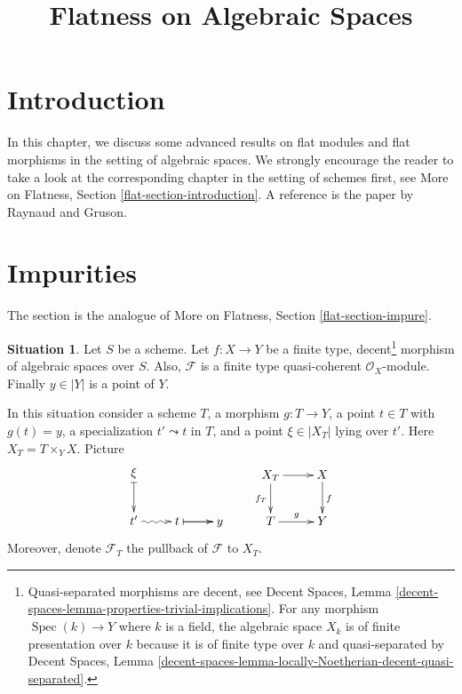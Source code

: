 \documentclass{stacks-project}
\theoremstyle{plain}
\theoremstyle{definition}
\newtheorem{situation}[subsection]{Situation}
\theoremstyle{remark}
\numberwithin{equation}{subsection}
\def\Spec{\mathop{\mathrm{Spec}}}
\begin{document}
\title{Flatness on Algebraic Spaces}

\maketitle

\label{section-phantom}

\tableofcontents



\section{Introduction}
\label{section-introduction}

\noindent
In this chapter, we discuss some advanced results on flat modules and
flat morphisms in the setting of algebraic spaces. We strongly encourage
the reader to take a look at the corresponding
chapter in the setting of schemes first, see
More on Flatness, Section \ref{flat-section-introduction}.
A reference is the paper \cite{GruRay} by Raynaud and Gruson.







\section{Impurities}
\label{section-impure}

\noindent
The section is the analogue of
More on Flatness, Section \ref{flat-section-impure}.

\begin{situation}
\label{situation-pre-pure}
Let $S$ be a scheme. Let $f : X \to Y$ be a
finite type, decent\footnote{Quasi-separated morphisms are decent, see
Decent Spaces, Lemma
\ref{decent-spaces-lemma-properties-trivial-implications}.
For any morphism $\Spec(k) \to Y$ where $k$ is a field,
the algebraic space $X_k$ is of finite presentation over $k$
because it is of finite type over $k$ and quasi-separated by
Decent Spaces, Lemma
\ref{decent-spaces-lemma-locally-Noetherian-decent-quasi-separated}.}
morphism of algebraic spaces over $S$. Also, $\mathcal{F}$ is a finite type
quasi-coherent $\mathcal{O}_X$-module. Finally $y \in |Y|$ is a point of $Y$.
\end{situation}

\noindent
In this situation consider a scheme $T$, a morphism $g : T \to Y$,
a point $t \in T$ with $g(t) = y$, a specialization $t' \leadsto t$ in
$T$, and a point $\xi \in |X_T|$ lying over $t'$. Here $X_T = T \times_Y X$.
Picture
\begin{equation}
\label{equation-impurity}
\vcenter{
\xymatrix{
\xi \ar@{|->}[d] & \\
t' \ar@{~>}[r] & t \ar@{|->}[r] \ar[r] & y
}
}
\quad\quad
\vcenter{
\xymatrix{
X_T \ar[d]_{f_T} \ar[r] & X \ar[d]^f \\
T \ar[r]^g & Y
}
}
\end{equation}
Moreover, denote $\mathcal{F}_T$ the pullback of $\mathcal{F}$ to $X_T$.
\end{document}
